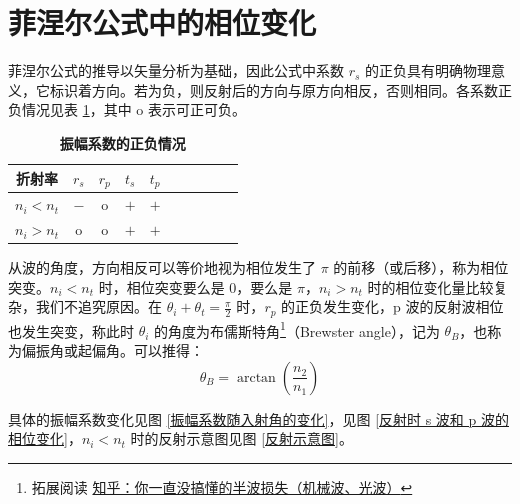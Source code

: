 \documentclass[UTF8]{report}
\theoremstyle{MyLineTheoremStyle} %
\theoremstyle{MyBlockTheoremStyle} %
\theoremstyle{MySubsubsectionStyle} %
\begin{document}
\section{菲涅尔公式中的相位变化}

菲涅尔公式的推导以矢量分析为基础，因此公式中系数 $r_s$ 的正负具有明确物理意义，它标识着方向。若为负，则反射后的方向与原方向相反，否则相同。各系数正负情况见表 \ref{振幅系数的正负情况}，其中 o 表示可正可负。

\begin{table}[H]\centering
        \caption{\textbf{振幅系数的正负情况}}
        \label{振幅系数的正负情况}
    \begin{tabular}{cccccccccc}\toprule
        折射率 & $r_s$& $r_p$ & $t_s$ & $t_p$\\
        \midrule                        
        $n_i < n_t$ & $-$ & o & $+$ & $+$\\
        $n_i > n_t$ & o & o & $+$ & $+$\\
        \bottomrule
    \end{tabular}
\end{table}

从波的角度，方向相反可以等价地视为相位发生了 $\pi$ 的前移（或后移），称为相位突变。$n_i < n_t$ 时，相位突变要么是 0，要么是 $\pi$，$n_i > n_t$ 时的相位变化量比较复杂，我们不追究原因。在 $\theta_i + \theta_t = \frac{\pi}{2}$ 时，$r_p$ 的正负发生变化，p 波的反射波相位也发生突变，称此时 $\theta_i$ 的角度为布儒斯特角\footnote{拓展阅读 \href{https://zhuanlan.zhihu.com/p/607510257}{知乎：你一直没搞懂的半波损失（机械波、光波）}}（Brewster angle），记为 $\theta_B$，也称为偏振角或起偏角。可以推得：
\begin{equation}
\theta_B = \arctan \left( \frac{n_2}{n_1} \right)
\end{equation}

具体的振幅系数变化见图 \ref{振幅系数随入射角的变化}，见图 \ref{反射时 s 波和 p 波的相位变化}，$n_i < n_t$ 时的反射示意图见图 \ref{反射示意图}。
\end{document}
